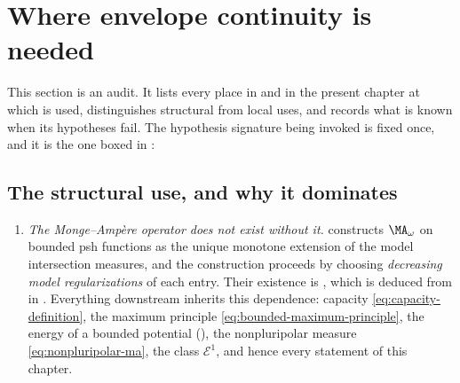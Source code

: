 \section{Where envelope continuity is needed}
\label{sec:ch27-where-continuity}

This section is an audit.  It lists every place in
 and in the present
chapter at which  is used, distinguishes
structural from local uses, and records what is known when its hypotheses
fail.  The hypothesis signature being invoked is fixed once, and it is the
one boxed in :

\begin{center}
\end{center}

\subsection{The structural use, and why it dominates}
\label{sec:ch27-structural-use}

\begin{enumerate}
\item[\textup{(EC1)}]
\emph{The Monge--Amp\`ere operator does not exist without it.}
 constructs \(\MA_\omega\) on bounded psh
functions as the unique monotone extension of the model intersection
measures, and the construction proceeds by choosing \emph{decreasing model
regularizations} of each entry.  Their existence is
, which is deduced from
 in
.  Everything downstream
inherits this dependence: capacity \eqref{eq:capacity-definition}, the
maximum principle \eqref{eq:bounded-maximum-principle}, the energy of a
bounded potential (), the
nonpluripolar measure \eqref{eq:nonpluripolar-ma}, the class
\(\mathcal E^1\), and hence every statement of this chapter.
\end{enumerate}

